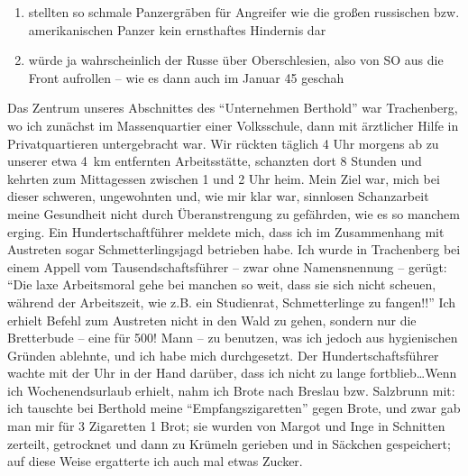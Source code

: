 \begin{enumerate}
	\item stellten so schmale Panzergräben für Angreifer wie die großen russischen bzw. amerikanischen Panzer kein ernsthaftes Hindernis dar
	\item würde ja wahrscheinlich der Russe über Oberschlesien, also von SO aus die Front aufrollen -- wie es dann auch im Januar 45 geschah
\end{enumerate}

Das Zentrum unseres Abschnittes des \enquote{Unternehmen Berthold} war Trachenberg, wo ich zunächst im Massenquartier einer Volksschule, dann mit ärztlicher Hilfe in Privatquartieren untergebracht war. Wir rückten täglich 4 Uhr morgens ab zu unserer etwa 4~km entfernten Arbeitsstätte, schanzten dort 8 Stunden und kehrten zum Mittagessen zwischen 1 und 2 Uhr heim. Mein Ziel war, mich bei dieser schweren, ungewohnten und, wie mir klar war, sinnlosen Schanzarbeit meine Gesundheit nicht durch Überanstrengung zu gefährden, wie es so manchem erging. Ein Hundertschaftführer meldete mich, dass ich im Zusammenhang mit Austreten sogar Schmetterlingsjagd betrieben habe. Ich wurde in Trachenberg bei  einem Appell vom Tausendschaftsführer -- zwar ohne Namensnennung -- gerügt: \enquote{Die laxe Arbeitsmoral gehe bei manchen so weit, dass sie sich nicht scheuen, während der Arbeitszeit, wie z.B. ein Studienrat, Schmetterlinge zu fangen!!} Ich erhielt Befehl zum Austreten nicht in den Wald zu gehen, sondern nur die Bretterbude -- eine für 500! Mann -- zu benutzen, was ich jedoch aus hygienischen Gründen ablehnte, und ich habe mich durchgesetzt. Der Hundertschaftsführer wachte mit der Uhr in der Hand darüber, dass ich nicht zu lange fortblieb\dots Wenn ich Wochenendsurlaub erhielt, nahm ich Brote nach Breslau bzw. Salzbrunn mit: ich tauschte bei Berthold meine \enquote{Empfangszigaretten} gegen Brote, und zwar gab man mir für 3 Zigaretten 1 Brot; sie wurden von Margot und Inge in Schnitten zerteilt, getrocknet und dann zu Krümeln gerieben und in Säckchen gespeichert; auf diese Weise ergatterte ich auch mal etwas Zucker.

